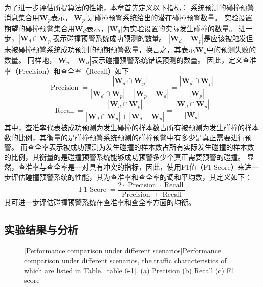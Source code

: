为了进一步评估所提算法的性能，本章首先定义以下指标：
系统预测的碰撞预警消息集合用$\mathbf{W}_{p}$表示，$\left| \mathbf{W}_{p} \right|$是碰撞预警系统给出的潜在碰撞预警数量。
实验设置期望的碰撞预警集合用$\mathbf{W}_{d}$表示，$\left| \mathbf{W}_{d} \right|$为实验设置的实际发生碰撞的数量。
进一步，$\left| \mathbf{W}_{d} \cap \mathbf{W}_{p} \right|$表示碰撞预警系统成功预测的数量。
$\left| \mathbf{W}_{d} - \mathbf{W}_{p} \right|$是应该被触发但未被碰撞预警系统成功预测的预期预警数量，换言之，其表示$\mathbf{W}_{p}$中的预测失败的数量。
同样地，$\left| {\mathbf{W}_{p} - \mathbf{W}_{d}} \right|$表示碰撞预警系统错误预测的数量。
因此，定义查准率（Precision）和查全率（Recall）如下
\begin{equation}
	\operatorname{Precision} = \frac{{\left| {\mathbf{W}_{d} \cap \mathbf{W}_{p}} \right|}}{{\left| {\mathbf{W}_{d} \cap \mathbf{W}_{p}} \right| + \left| {\mathbf{W}_{p} - \mathbf{W}_{d}} \right|}} = \frac{{\left| {\mathbf{W}_{d} \cap \mathbf{W}_{p}} \right|}}{\left| \mathbf{W}_{p} \right|}
\end{equation}
\begin{equation}
	\operatorname{Recall} = \frac{{\left| {\mathbf{W}_{d} \cap \mathbf{W}_{p}} \right|}}{{\left| {\mathbf{W}_{d} \cap \mathbf{W}_{p}} \right| + \left| {\mathbf{W}_{d} - \mathbf{W}_{p}} \right|}} = \frac{{\left| {\mathbf{W}_{d} \cap \mathbf{W}_{p}} \right|}}{\left| \mathbf{W}_{d} \right|} 
\end{equation}
其中，查准率代表被成功预测为发生碰撞的样本数占所有被预测为发生碰撞的样本数的比例，其衡量的是碰撞预警系统预测的碰撞预警中有多少是真正需要进行预警。
而查全率表示被成功预测为发生碰撞的样本数占所有实际发生碰撞的样本数的比例，其衡量的是碰撞预警系统能够成功预警多少个真正需要预警的碰撞。
显然，查准率与查全率是一对具有冲突的指标，因此，使用F1值（F1 Score）来进一步评估碰撞预警系统的性能，其为查准率和查全率的调和平均数，其定义如下：
\begin{equation}
	\operatorname{F1\ Score} = \frac{2 \cdot \operatorname{Precision} \cdot \operatorname{Recall}}{\operatorname{Precision} + \operatorname{Recall}} 
\end{equation}
其可进一步评估碰撞预警系统在查准率和查全率方面的均衡。

\subsection{实验结果与分析}

\begin{figure}[h]
     \centering
     [Performance comparison under different scenarios]{Performance comparison under different scenarios, the traffic characteristics of which are listed in Table. \ref{table 6-1}. (a) Precision (b) Recall (c) F1 score}
     \label{fig 5-4}
\end{figure}

